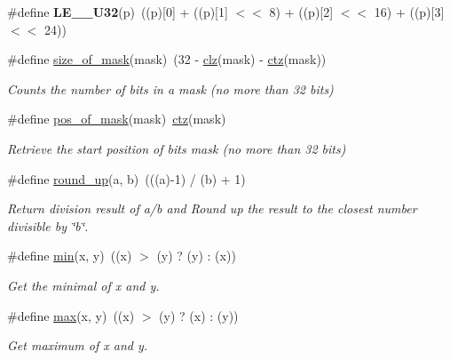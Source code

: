 \begin{DoxyCompactItemize}
\mbox{\label{group__doc__driver__hal__utils__macro_gac21ac7b0f38e7b8138886c362d9cc663}} 
\#define {\bfseries L\+E\+\_\+\_\+\+U32}(p)~((p)\mbox{[}0\mbox{]} + ((p)\mbox{[}1\mbox{]} $<$$<$ 8) + ((p)\mbox{[}2\mbox{]} $<$$<$ 16) + ((p)\mbox{[}3\mbox{]} $<$$<$ 24))
\item 
\#define \hyperlink{group__doc__driver__hal__utils__macro_gacb24f277663a5c87482fbcdbef5f2bd2}{size\+\_\+of\+\_\+mask}(mask)~(32 -\/ \hyperlink{group__doc__driver__hal__utils__macro_ga004f88903a09b9c23017e697eaf5a845}{clz}(mask) -\/ \hyperlink{group__doc__driver__hal__utils__macro_gab069bfec305db5213465d3b689836404}{ctz}(mask))
\begin{DoxyCompactList}\small\item\em Counts the number of bits in a mask (no more than 32 bits) \end{DoxyCompactList}\item 
\#define \hyperlink{group__doc__driver__hal__utils__macro_ga6e6ec9c159cae4680d073d707063fa0e}{pos\+\_\+of\+\_\+mask}(mask)~\hyperlink{group__doc__driver__hal__utils__macro_gab069bfec305db5213465d3b689836404}{ctz}(mask)
\begin{DoxyCompactList}\small\item\em Retrieve the start position of bits mask (no more than 32 bits) \end{DoxyCompactList}\item 
\mbox{\label{group__doc__driver__hal__utils__macro_gab4181d52c8a5083a8f30e3063893f3da}} 
\#define \hyperlink{group__doc__driver__hal__utils__macro_gab4181d52c8a5083a8f30e3063893f3da}{round\+\_\+up}(a,  b)~(((a)-\/1) / (b) + 1)
\begin{DoxyCompactList}\small\item\em Return division result of a/b and Round up the result to the closest number divisible by \char`\"{}b\char`\"{}. \end{DoxyCompactList}\item 
\mbox{\label{group__doc__driver__hal__utils__macro_gabb702d8b501669a23aa0ab3b281b9384}} 
\#define \hyperlink{group__doc__driver__hal__utils__macro_gabb702d8b501669a23aa0ab3b281b9384}{min}(x,  y)~((x) $>$ (y) ? (y) \+: (x))
\begin{DoxyCompactList}\small\item\em Get the minimal of x and y. \end{DoxyCompactList}\item 
\mbox{\label{group__doc__driver__hal__utils__macro_gac39d9cef6a5e030ba8d9e11121054268}} 
\#define \hyperlink{group__doc__driver__hal__utils__macro_gac39d9cef6a5e030ba8d9e11121054268}{max}(x,  y)~((x) $>$ (y) ? (x) \+: (y))
\begin{DoxyCompactList}\small\item\em Get maximum of x and y. \end{DoxyCompactList}\end{DoxyCompactItemize}
